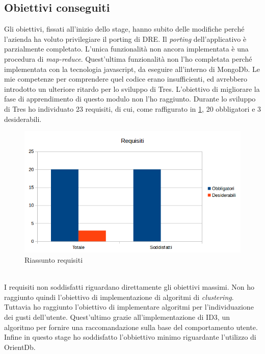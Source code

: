\subsection{Obiettivi conseguiti}
Gli obiettivi, fissati all'inizio dello stage, hanno subito delle modifiche perché l'azienda ha voluto privilegiare il porting di DRE. Il \emph{porting} dell'applicativo è parzialmente completato. L'unica funzionalità non ancora implementata è una procedura di \emph{map-reduce}. Quest'ultima funzionalità non l'ho completata perché implementata con la tecnologia javascript, da eseguire all'interno di MongoDb. Le mie competenze per comprendere quel codice erano insufficienti, ed avrebbero introdotto un ulteriore ritardo per lo sviluppo di Tres. L'obiettivo di migliorare la fase di apprendimento di questo modulo non l'ho raggiunto. Durante lo sviluppo di Tres ho individuato 23 requisiti, di cui, come raffigurato in \ref{fig:graficorequisiti}, 20 obbligatori e 3 desiderabili.  
\begin{figure}[h]
\centering
\includegraphics[scale=0.62]{immagini/graficorequisiti}
\caption{Riassunto requisiti}
\label{fig:graficorequisiti}
\end{figure}
\\I requisiti non soddisfatti riguardano direttamente gli obiettivi massimi. Non ho raggiunto quindi l'obiettivo di implementazione di algoritmi di \emph{clustering}. Tuttavia ho raggiunto l'obiettivo di implementare algoritmi per l'individuazione dei gusti dell'utente. Quest'ultimo grazie all'implementazione di ID3, un algoritmo per fornire una raccomandazione sulla base del comportamento utente. Infine in questo stage ho soddisfatto l'obbiettivo minimo riguardante l'utilizzo di OrientDb.
